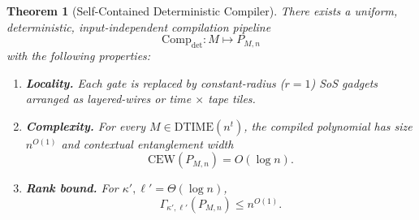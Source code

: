 \documentclass[12pt]{article}
\newtheorem{theorem}{Theorem}
\theoremstyle{definition}
\theoremstyle{definition}
\theoremstyle{remark}
\theoremstyle{remark}
\begin{document}
\begin{theorem}[Self-Contained Deterministic Compiler]\label{thm:self-contained-det-compiler}
There exists a uniform, deterministic, input-independent compilation pipeline
\[
\mathrm{Comp}_{\mathrm{det}} : M \longmapsto P_{M,n}
\]
with the following properties:
\begin{enumerate}
\item \textbf{Locality.} Each gate is replaced by constant-radius ($r=1$) SoS gadgets arranged as layered-wires or time $\times$ tape tiles.

\item \textbf{Complexity.} For every $M \in \mathrm{DTIME}(n^t)$, the compiled polynomial has size $n^{O(1)}$ and contextual entanglement width
\[
\mathrm{CEW}(P_{M,n}) = O(\log n).
\]

\item \textbf{Rank bound.} For $\kappa', \ell' = \Theta(\log n)$,
\[
\Gamma_{\kappa',\ell'}(P_{M,n}) \leq n^{O(1)}.
\]
\end{enumerate}
\end{theorem}
\end{document}
